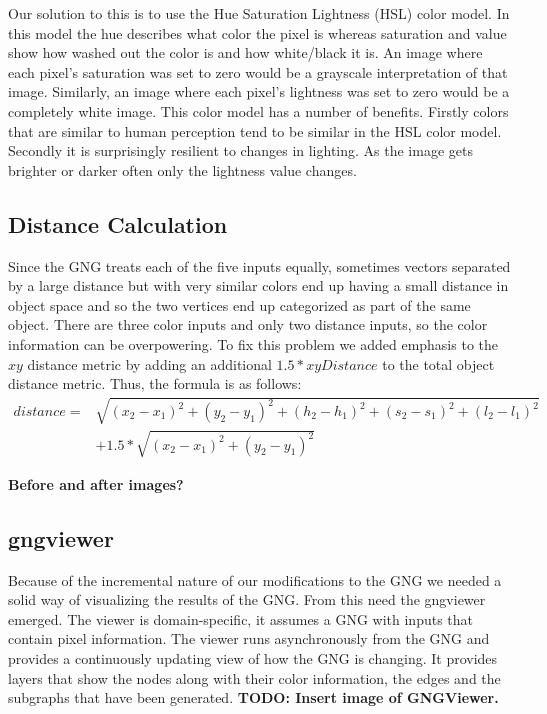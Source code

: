 \documentclass{article}
\renewcommand{\|}{\origbar} %
\begin{document}
Our solution to this is to use the Hue Saturation Lightness (HSL) color model. In this model the hue describes what color the pixel is whereas saturation and value show how washed out the color is and how white/black it is. An image where each pixel's saturation was set to zero would be a grayscale interpretation of that image. Similarly, an image where each pixel's lightness was set to zero would be a completely white image. This color model has a number of benefits. Firstly colors that are similar to human perception tend to be similar in the HSL color model. Secondly it is surprisingly resilient to changes in lighting. As the image gets brighter or darker often only the lightness value changes.


\subsection{Distance Calculation}


Since the GNG treats each of the five inputs equally, sometimes vectors separated by a large distance but with very similar colors end up having a small distance in object space and so the two vertices end up categorized as part of the same object. There are three color inputs and only two distance inputs, so the color information can be overpowering. To fix this problem we added emphasis to the $xy$ distance metric by adding an additional $1.5 * xyDistance$ to the total object distance metric. Thus, the formula is as follows:
\begin{align*}
  distance = &\sqrt{(x_2-x_1)^2+(y_2-y_1)^2+(h_2-h_1)^2+(s_2-s_1)^2+(l_2-l_1)^2} \\ &+ 1.5*\sqrt{(x_2-x_1)^2+(y_2-y_1)^2}
\end{align*}

{\bf Before and after images?}

\subsection{gngviewer}

Because of the incremental nature of our modifications to the GNG we needed a solid way of visualizing the results of the GNG. From this need the gngviewer emerged. The viewer is domain-specific, it assumes a GNG with inputs that contain pixel information. The viewer runs asynchronously from the GNG and provides a continuously updating view of how the GNG is changing. It provides layers that show the nodes along with their color information, the edges and the subgraphs that have been generated. {\bf TODO: Insert image of GNGViewer.}
\end{document}
